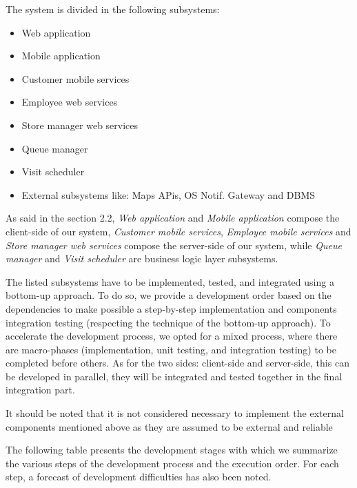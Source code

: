 The system is divided in the following subsystems:
\begin{itemize}
    \item Web application
    \item Mobile application
    \item Customer mobile services
    \item Employee web services
    \item Store manager web services
    \item Queue manager
    \item Visit scheduler
    \item External subsystems like: Maps APis, OS Notif. Gateway and DBMS
\end{itemize}
As said in the section 2.2, \textit{Web application} and \textit{Mobile application} compose the client-side of our system, \textit{Customer mobile services}, \textit{Employee mobile services} and \textit{Store manager web services} compose the server-side of our system, while \textit{Queue manager} and \textit{Visit scheduler} are business logic layer subsystems. 

The listed subsystems have to be implemented, tested, and integrated using a bottom-up approach. To do so, we provide a development order based on the dependencies to make possible a step-by-step implementation and components integration testing (respecting the technique of the bottom-up approach). To accelerate the development process, we opted for a mixed process, where there are macro-phases (implementation, unit testing, and integration testing) to be completed before others. As for the two sides: client-side and server-side, this can be developed in parallel, they will be integrated and tested together in the final integration part.

It should be noted that it is not considered necessary to implement the external components mentioned above as they are assumed to be external and reliable

The following table presents the development stages with which we summarize the various steps of the development process and the execution order. For each step, a forecast of development difficulties has also been noted.

